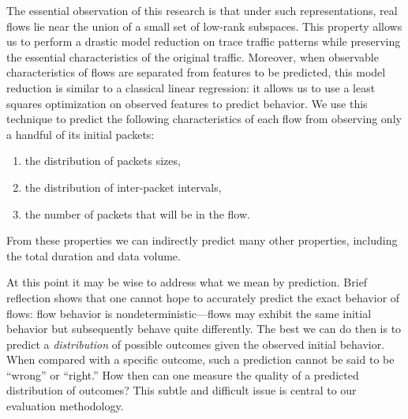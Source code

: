 \documentclass[conference]{IEEEtran}
\begin{document}
The essential observation of this research is that under such representations, real flows lie near the union of a small set of low-rank subspaces.
This property allows us to perform a drastic model reduction on trace traffic patterns while preserving the essential characteristics of the original traffic.
Moreover, when observable characteristics of flows are separated from features to be predicted, this model reduction is similar to a classical linear regression:
it allows us to use a least squares optimization on observed features to predict behavior.
We use this technique to predict the following characteristics of each flow from observing only a handful of its initial packets:
\begin{enumerate}
  \item the distribution of packets sizes,
  \item the distribution of inter-packet intervals,
  \item the number of packets that will be in the flow.
\end{enumerate}
From these properties we can indirectly predict many other properties, including the total duration and data volume.

At this point it may be wise to address what we mean by prediction.
Brief reflection shows that one cannot hope to accurately predict the exact behavior of flows:
flow behavior is nondeterministic---flows may exhibit the same initial behavior but subsequently behave quite differently.
The best we can do then is to predict a \emph{distribution} of possible outcomes given the observed initial behavior.
When compared with a specific outcome, such a prediction cannot be said to be ``wrong'' or ``right.''
How then can one measure the quality of a predicted distribution of outcomes?
This subtle and difficult issue is central to our evaluation methodology.


\end{document}
